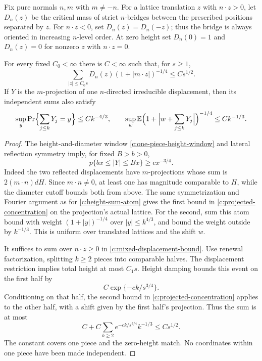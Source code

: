 Fix pure normals $n,m$ with $m\ne-n$. For a lattice translation $z$
with $n\cdot z>0$, let $D_n(z)$ be the critical mass of strict
$n$-bridges between the prescribed positions separated by $z$.
For $n\cdot z<0$, set $D_n(z)=D_n(-z)$; thus the bridge is always
oriented in increasing $n$-level order. At zero height set
$D_n(0)=1$ and $D_n(z)=0$ for nonzero $z$ with $n\cdot z=0$.

\begin{lemma}\label{c:mixed-displacement}
For every fixed $C_0<\infty$ there is $C<\infty$ such that, for $s\ge1$,
\begin{equation}\label{c:mixed-displacement-bound}
 \sum_{|z|\le C_0s}D_n(z)(1+|m\cdot z|)^{-1/4}\le Cs^{1/2}.
\end{equation}
If $Y$ is the $m$-projection of one $n$-directed irreducible displacement,
then its independent sums also satisfy
\begin{equation}\label{c:projected-concentration}
 \sup_y\Pr\Bigl\{\sum_{j\le k}Y_j=y\Bigr\}\le Ck^{-4/3},
 \qquad
 \sup_w\mathbb E\Bigl(1+\Bigl|w+\sum_{j\le k}Y_j\Bigr|\Bigr)^{-1/4}
 \le Ck^{-1/3}.
\end{equation}
\end{lemma}
\begin{proof}
The height-and-diameter window \eqref{c:one-piece-height-window} and
lateral reflection symmetry imply, for fixed $B>b>0$,
\[
 p\{bx\le |Y|\le Bx\}\ge cx^{-3/4}.
\]
Indeed the two reflected displacements have $m$-projections whose sum
is $2(m\cdot n)dH$. Since $m\cdot n\ne0$, at least one has magnitude
comparable to $H$, while the diameter cutoff bounds both from above.
The same symmetrization and Fourier argument as for
\eqref{c:height-sum-atom} gives the first bound in
\eqref{c:projected-concentration} on the projection's actual lattice.
For the second, sum this atom bound with weight $(1+|y|)^{-1/4}$
over $|y|\le k^{4/3}$, and bound the weight outside by $k^{-1/3}$.
This is uniform over translated lattices and the shift $w$.

It suffices to sum over $n\cdot z\ge0$ in
\eqref{c:mixed-displacement-bound}. Use renewal factorization, splitting
$k\ge2$ pieces into comparable halves. The displacement restriction
implies total height at most $C_1s$. Height damping bounds this event
on the first half by
\[
 C\exp\{-ck/s^{3/4}\}.
\]
Conditioning on that half, the second bound in
\eqref{c:projected-concentration} applies to the other half, with a
shift given by the first half's projection. Thus the sum is at most
\[
 C+C\sum_{k\ge2}e^{-ck/s^{3/4}}k^{-1/3}\le Cs^{1/2}.
\]
The constant covers one piece and the zero-height match. No coordinates
within one piece have been made independent.
\end{proof}

